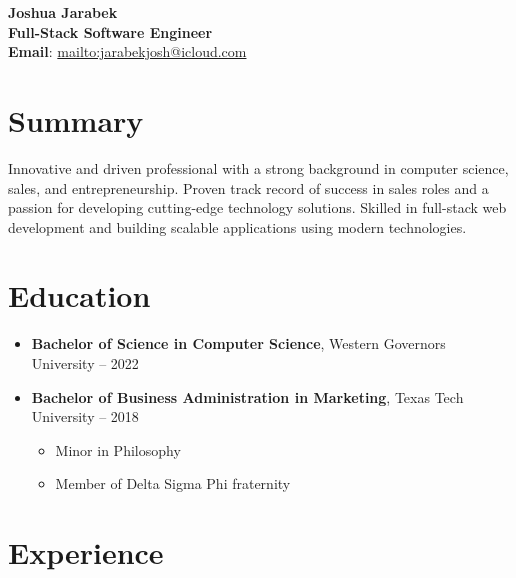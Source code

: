 \documentclass[a4paper,10pt]{article}
\newcommand{\infoitem}[2]{\textbf{#1}: \href{#2}{#2}}
\begin{document}
\begin{center}
    \textbf{\Huge Joshua Jarabek} \\
    \vspace{2mm}
    \textbf{Full-Stack Software Engineer} \\
    \vspace{2mm}
    \infoitem{Email}{mailto:jarabekjosh@icloud.com} \quad {}
\end{center}

\vspace{5mm}

\section*{Summary}
Innovative and driven professional with a strong background in computer science, sales, and entrepreneurship. Proven track record of success in sales roles and a passion for developing cutting-edge technology solutions. Skilled in full-stack web development and building scalable applications using modern technologies.

\section*{Education}
\begin{itemize}[leftmargin=0in, label={}]
    \item \textbf{Bachelor of Science in Computer Science}, Western Governors University -- 2022
    \item \textbf{Bachelor of Business Administration in Marketing}, Texas Tech University -- 2018
          \begin{itemize}
              \item Minor in Philosophy
              \item Member of Delta Sigma Phi fraternity
          \end{itemize}
\end{itemize}

\section*{Experience}
\end{document}
